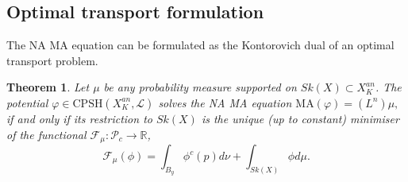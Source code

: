 \documentclass[a4paper]{article}
\newtheorem{thm}{Theorem}[section]
\theoremstyle{definition}
\newcommand{\R}{\mathbb{R}}
\begin{document}
	
	
	
	
	
	
	
	\subsection{Optimal transport formulation}
	
	
	
	

	
	
The NA MA equation can be formulated as the Kontorovich dual of an optimal transport problem.
	
	
	
	
	
	
	
	
	
	
\begin{thm} \label{thm:optimaltransport}
Let $\mu$ be any probability measure supported on $Sk(X)\subset X_K^{an}$. 
The potential $\varphi\in \text{CPSH}(X_K^{an},\mathcal{L})$ solves the NA MA equation
$
	\text{MA}(\varphi )=(L^n) \mu,
$
if and only if its restriction to $Sk(X)$ is the unique (up to constant) minimiser of the functional $\mathcal{F}_\mu: \mathcal{P}_c\to \R$,
\[
\mathcal{F}_\mu(\phi)=  \int_{B_y}  \phi^c(p)   d\nu+  \int_{Sk(X)} \phi d\mu.
\]
\end{thm}
	
	
		
		
		
\end{document}
